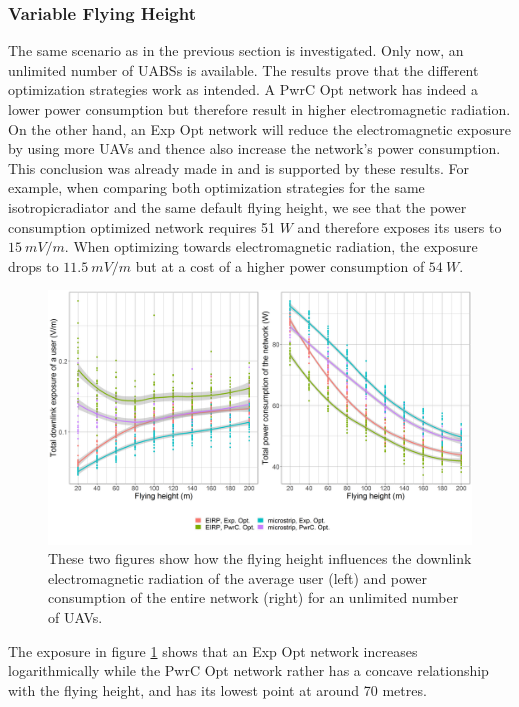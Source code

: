 \documentclass[twocolumn]{phdsymp} %
\begin{document}
\subsubsection{Variable Flying Height}
The same scenario as in the previous section is investigated. Only now, an unlimited number of \gls{UABS}s is available.
The results prove that the different optimization strategies work as intended.
A \gls{PwrC Opt} network has indeed a lower power consumption but therefore result in higher electromagnetic radiation.
On the other hand, an \gls{Exp Opt} network will reduce the electromagnetic exposure by using more \gls{UAV}s and thence also increase the network's
power consumption. This conclusion was already made in \cite{J1} and is supported by these results.
For example, when comparing both optimization strategies for the same \gls{isotropicradiator} and the same default flying height, we see that
the power consumption optimized network requires 51 $W$ and therefore exposes its users
to $15\ mV/m$. When optimizing towards electromagnetic radiation, the exposure drops to $11.5\ mV/m$ but at a cost of a higher power consumption
of $54\ W$.
\begin{figure}[h!]
  \includegraphics[width=\linewidth]{../results/s3/fhvsdlAndPc.png}
  \caption{These two figures show how the flying height influences the downlink electromagnetic radiation of the average user (left) and 
  power consumption of the entire network (right) for an unlimited number of \gls{UAV}s.}
  \label{fig:s3a_dlAndPc}
\end{figure}

The exposure in figure \ref{fig:s3a_dlAndPc} shows that an \gls{Exp Opt} network increases logarithmically while the \gls{PwrC Opt} network rather 
has a concave relationship with the flying height, and has its lowest point at around 70 metres.
\end{document}
